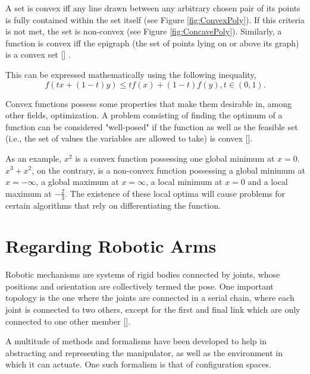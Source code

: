 A set is convex iff any line drawn between any arbitrary chosen pair of its points is fully contained within the set itself (see Figure \ref{fig:ConvexPoly}). If this criteria is not met, the set is non-convex (see Figure \ref{fig:ConcavePoly}). Similarly, a function is convex iff the epigraph (the set of points lying on or above its graph) is a convex set [\citeauthor{Sasane2016}] .

This can be expressed mathematically using the following inequality,
\begin{equation}
f(tx + (1 - t)y) \leq t f(x) + (1 - t)f(y), t \in (0, 1).
\end{equation}

Convex functions possess some properties that make them desirable in, among other fields, optimization. A problem consisting of finding the optimum of a function can be considered "well-posed" if the function as well as the feasible set (i.e., the set of values the variables are allowed to take) is convex [\citeauthor{Sasane2016}].

As an example, $x^2$ is a convex function possessing one global minimum at $x=0$. $x^3 + x^2$, on the contrary, is a non-convex function possessing a global minimum at $x=-\infty$, a global maximum at $x=\infty$, a local minimum at $x=0$ and a local maximum at $-\frac{2}{3}$. The existence of these local optima will cause problems for certain algorithms that rely on differentiating the function.


\section{Regarding Robotic Arms}

Robotic mechanisms are systems of rigid bodies connected by joints, whose positions and orientation are collectively termed the pose. One important topology is the one where the joints are connected in a serial chain, where each joint is connected to two others, except for the first and final link which are only connected to one other member [\citeauthor{Siciliano2016}].

A multitude of methods and formalisms have been developed to help in abstracting and representing the manipulator, as well as the environment in which it can actuate. One such formalism is that of configuration spaces. %


